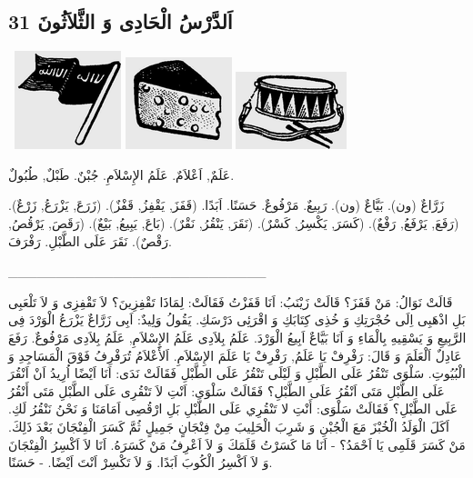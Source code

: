 \documentclass[a5paper]{article}
\begin{document}
\subsection[اَلدَّرْسُ الْحَادِى وَ الثَّلاَثُونَ 31]{اَلدَّرْسُ الْحَادِى وَ الثَّلاَثُونَ 31}
\  \includegraphics[width=1.2189in,height=1.1252in]{MuhammadBagauddinlatinized-img063.png}   \includegraphics[width=1.2189in,height=1.052in]{MuhammadBagauddinlatinized-img064.png}   \includegraphics[width=1.2709in,height=0.8854in]{MuhammadBagauddinlatinized-img065.png} 

عَلَمٌ, اَعْلاَمٌ. عَلَمُ الإِسْلاَمِ. جُبْنٌ. طَبْلٌ, طُبُولٌ.

زَرَّاعٌ (ون). بَيَّاعٌ (ون). رَبِيعٌ. مَرْفُوعٌ. حَسَنًا. اَبَدًا. (قَفَزَ, يَقْفِزُ, قَفْزٌ). (زَرَعَ, يَزْرَعُ, زَرْعٌ). (رَفَعَ, يَرْفَعُ, رَفْعٌ). (كَسَرَ, يَكْسِرُ, كَسْرٌ). (نَقَرَ, يَنْقُرُ, نَقْرٌ). (بَاعَ, يَبِيعُ, بَيْعٌ). (رَقَصَ, يَرْقُصُ, رَقْصٌ). نَقَرَ عَلَى الطَّبْلِ. رَفْرَفَ.

\_\_\_\_\_\_\_\_\_\_\_\_\_\_\_\_\_\_\_\_\_\_\_\_\_\_\_

قَالَتْ نَوَالُ: مَنْ قَفَزَ؟ قَالَتْ زَيْنَبُ: اَنَا قَفَزْتُ فَقَالَتْ: لِمَاذَا تَقْفِزِينَ؟ لاَ تَقْفِزِى وَ لاَ تَلْعَبِى بَلِ اذْهَبِى اِلَى حُجْرَتِكِ وَ خُذِى كِتَابَكِ وَ اقْرَئِى دَرْسَكِ. يَقُولُ وَلِيدٌ: اَبِى زَرَّاعٌ يَزْرَعُ الْوَرْدَ فِى الرَّبِيعِ وَ يَسْقِيهِ بِالْمَاءِ وَ اَنَا بَيَّاعٌ اَبِيعُ الْوَرْدَ. عَلَمُ بِلاَدِى عَلَمُ الإِسْلاَمِ, عَلَمُ بِلاَدِى مَرْفُوعٌ. رَفَعَ عَادِلٌ اَلْعَلَمَ وَ قَالَ: رَفْرِفْ يَا عَلَمُ, رَفْرِفْ يَا عَلَمَ الإِسْلاَمِ. اَلأَعْلاَمُ تُرَفْرِفُ فَوْقَ الْمَسَاجِدِ وَ الْبُيُوتِ. سَلْوَى تَنْقُرُ عَلَى الطَّبْلِ وَ لَيْلَى تَنْقُرُ عَلَى الطَّبْلِ فَقَالَتْ نَدَى: اَنَا اَيْضًا اُرِيدُ اَنْ اَنْقُرَ عَلَى الطَّبْلِ مَتَى اَنْقُرُ عَلَى الطَّبْلِ؟ فَقَالَتْ سَلْوَى: اَنْتِ لاَ تَنْقُرِى عَلَى الطَّبْلِ مَتَى أَنْقُرُ عَلَى الطَّبْلِ؟ فَقَالَتْ سَلْوَى: أَنْتِ لا تَنْقُرِي عَلَى الطَّبْلِ بَلِ ارْقُصِى اَمَامَنَا وَ نَحْنُ نَنْقُرُ لَكِ. اَكَلَ الْوَلَدُ الْخُبْزَ مَعَ الْجُبْنِ وَ شَرِبَ الْحَلِيبَ مِنْ فِنْجَانٍ جَمِيلٍ ثُمَّ كَسَرَ الْفِنْجَانَ بَعْدَ ذَلِكَ. مَنْ كَسَرَ قَلَمِى يَا اَحْمَدُ؟ - اَنَا مَا كَسَرْتُ قَلَمَكَ وَ لاَ اَعْرِفُ مَنْ كَسَرَهُ. اَنَا لاَ اَكْسِرُ الْفِنْجَانَ وَ لاَ اَكْسِرُ الْكُوبَ اَبَدًا. وَ لاَ تَكْسِرْ اَنْتَ اَيْضًا. - حَسَنًا.
\end{document}
